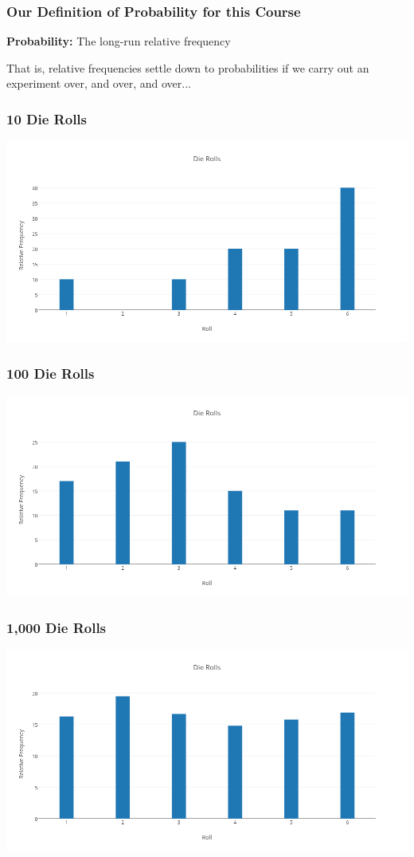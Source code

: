 \documentclass{beamer}
\begin{document}
\begin{frame}
\frametitle{Our Definition of Probability for this Course}
    \textbf{Probability:} The long-run relative frequency

	\vspace{3em}
	\alert{That is, relative frequencies settle down to probabilities if we carry out an experiment over, and over, and over...}
\end{frame}

\begin{frame}
\frametitle{10 Die Rolls}
    \centering
    \includegraphics[scale = 0.3]{./images/die1.png}
\end{frame}

\begin{frame}
\frametitle{100 Die Rolls}
	\centering
	\includegraphics[scale = 0.3]{./images/die2.png}
\end{frame}

\begin{frame}
\frametitle{1,000 Die Rolls}
	\centering
	\includegraphics[scale = 0.3]{./images/die3.png}
\end{frame}
\end{document}
